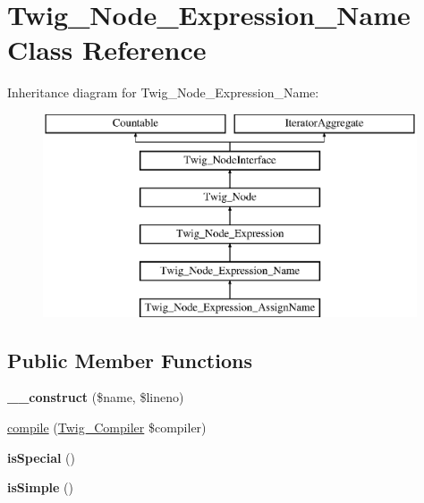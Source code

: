 \hypertarget{classTwig__Node__Expression__Name}{}\section{Twig\+\_\+\+Node\+\_\+\+Expression\+\_\+\+Name Class Reference}
\label{classTwig__Node__Expression__Name}
Inheritance diagram for Twig\+\_\+\+Node\+\_\+\+Expression\+\_\+\+Name\+:\begin{figure}[H]
\begin{center}
\leavevmode
\includegraphics[height=6.000000cm]{classTwig__Node__Expression__Name}
\end{center}
\end{figure}
\subsection*{Public Member Functions}
\begin{DoxyCompactItemize}
\item 
{\bfseries \+\_\+\+\_\+construct} (\$name, \$lineno)\hypertarget{classTwig__Node__Expression__Name_a44d1c7b7da485854ad61472a9ee14c85}{}\label{classTwig__Node__Expression__Name_a44d1c7b7da485854ad61472a9ee14c85}

\item 
\hyperlink{classTwig__Node__Expression__Name_a7973133f15bbbcc8cc0bcf2a7c64ff49}{compile} (\hyperlink{classTwig__Compiler}{Twig\+\_\+\+Compiler} \$compiler)
\item 
{\bfseries is\+Special} ()\hypertarget{classTwig__Node__Expression__Name_a64c3a6826c35cb6522c031888d6c1b76}{}\label{classTwig__Node__Expression__Name_a64c3a6826c35cb6522c031888d6c1b76}

\item 
{\bfseries is\+Simple} ()\hypertarget{classTwig__Node__Expression__Name_a67b6faee681fb997eab58f5a22153079}{}\label{classTwig__Node__Expression__Name_a67b6faee681fb997eab58f5a22153079}

\end{DoxyCompactItemize}
